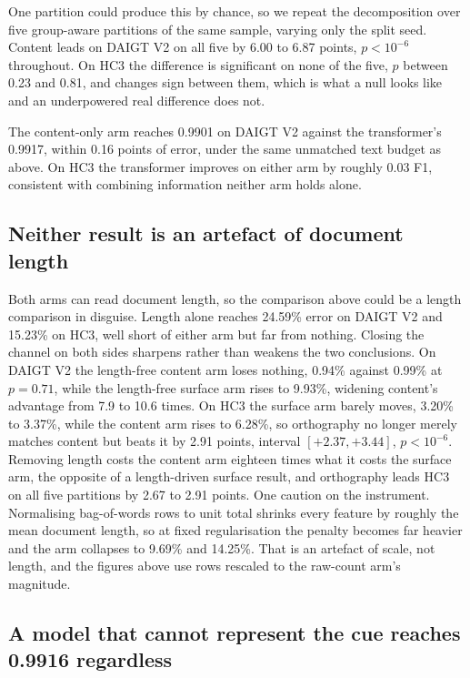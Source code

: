 One partition could produce this by chance, so we repeat the decomposition over five group-aware partitions of the same sample, varying only the split seed. Content leads on DAIGT V2 on all five by 6.00 to 6.87 points, $p < 10^{-6}$ throughout. On HC3 the difference is significant on none of the five, $p$ between 0.23 and 0.81, and changes sign between them, which is what a null looks like and an underpowered real difference does not.

The content-only arm reaches 0.9901 on DAIGT V2 against the transformer's 0.9917, within 0.16 points of error, under the same unmatched text budget as above. On HC3 the transformer improves on either arm by roughly 0.03 F1, consistent with combining information neither arm holds alone.

\subsection{Neither result is an artefact of document length}
\label{sec:decomp}

Both arms can read document length, so the comparison above could be a length comparison in disguise. Length alone reaches 24.59\% error on DAIGT V2 and 15.23\% on HC3, well short of either arm but far from nothing. Closing the channel on both sides sharpens rather than weakens the two conclusions. On DAIGT V2 the length-free content arm loses nothing, 0.94\% against 0.99\% at $p=0.71$, while the length-free surface arm rises to 9.93\%, widening content's advantage from 7.9 to 10.6 times. On HC3 the surface arm barely moves, 3.20\% to 3.37\%, while the content arm rises to 6.28\%, so orthography no longer merely matches content but beats it by 2.91 points, interval $[+2.37, +3.44]$, $p < 10^{-6}$. Removing length costs the content arm eighteen times what it costs the surface arm, the opposite of a length-driven surface result, and orthography leads HC3 on all five partitions by 2.67 to 2.91 points. One caution on the instrument. Normalising bag-of-words rows to unit total shrinks every feature by roughly the mean document length, so at fixed regularisation the penalty becomes far heavier and the arm collapses to 9.69\% and 14.25\%. That is an artefact of scale, not length, and the figures above use rows rescaled to the raw-count arm's magnitude.

\subsection{A model that cannot represent the cue reaches 0.9916 regardless}

